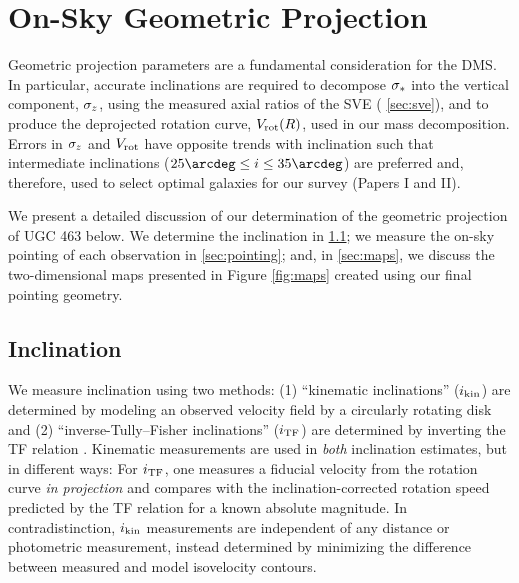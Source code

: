 \documentclass[apj,iop,numberedappendix]{emulateapj}
\begin{document}
\section{On-Sky Geometric Projection}
\label{sec:geom}

Geometric projection parameters are a fundamental consideration for the DMS.  In
particular, accurate inclinations are required to decompose $\sigma_{\ast}$ into the
vertical component, $\sigma_z$, using the measured axial ratios of the SVE (\sect
\ref{sec:sve}), and to produce the deprojected rotation curve, $V_{\rm rot}(R)$, used
in our mass decomposition.  Errors in $\sigma_z$ and $V_{\rm rot}$ have opposite trends
with inclination such that intermediate inclinations ($25\arcdeg \leq i \leq
35\arcdeg$) are preferred and, therefore, used to select optimal galaxies for
our survey (Papers I and II).

We present a detailed discussion of our determination of the geometric
projection of UGC 463 below.  We determine the inclination in \sect
\ref{sec:inclination}; we measure the on-sky pointing of each observation in
\sect \ref{sec:pointing}; and, in \sect \ref{sec:maps}, we discuss the
two-dimensional maps presented in Figure \ref{fig:maps} created using our final
pointing geometry.

\subsection{Inclination}
\label{sec:inclination}

We measure inclination using two methods: (1) ``kinematic inclinations''
($i_{\rm kin}$) are determined by modeling an observed velocity field by a circularly
rotating disk and (2) ``inverse-Tully--Fisher inclinations'' ($i_{\rm TF}$) are
determined by inverting the TF relation \citep{1995ApJ...447...82R}.  Kinematic
measurements are used in {\it both} inclination estimates, but in different
ways:  For $i_{\rm TF}$, one measures a fiducial velocity from the rotation curve
 {\it
in projection} and compares with the inclination-corrected rotation speed
predicted by the TF relation for a known absolute magnitude.  In
contradistinction, $i_{\rm kin}$ measurements are independent of any distance or
photometric measurement, instead determined by minimizing the difference between
measured and model isovelocity contours. 
\end{document}
